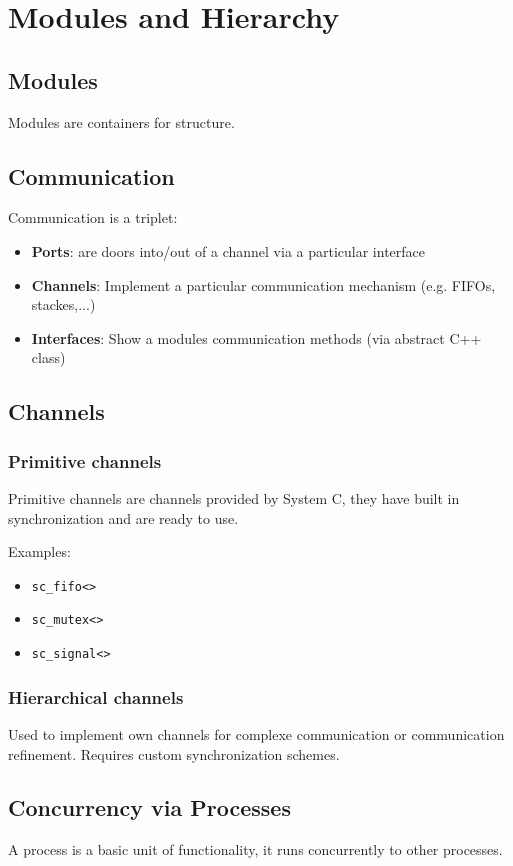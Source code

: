 \section{Modules and Hierarchy}
\subsection{Modules}
Modules are containers for structure.

\subsection{Communication}
Communication is a triplet:
\begin{itemize}
    \item \textbf{Ports}: are doors into/out of a channel via a particular interface
    \item \textbf{Channels}: Implement a particular communication mechanism (e.g. FIFOs, stackes,...) 
    \item \textbf{Interfaces}: Show a modules communication methods (via abstract C++ class)
\end{itemize}

\subsection{Channels}
\subsubsection{Primitive channels}
Primitive channels are channels provided by System C, they have built in synchronization and are ready to use.

Examples:
\begin{itemize}
    \item \lstinline{sc_fifo<>}
    \item \lstinline{sc_mutex<>}
    \item \lstinline{sc_signal<>}
\end{itemize}

\subsubsection{Hierarchical channels}
Used to implement own channels for complexe communication or communication refinement.
Requires custom synchronization schemes.

\subsection{Concurrency via Processes}
A process is a basic unit of functionality, it runs concurrently to other processes.

